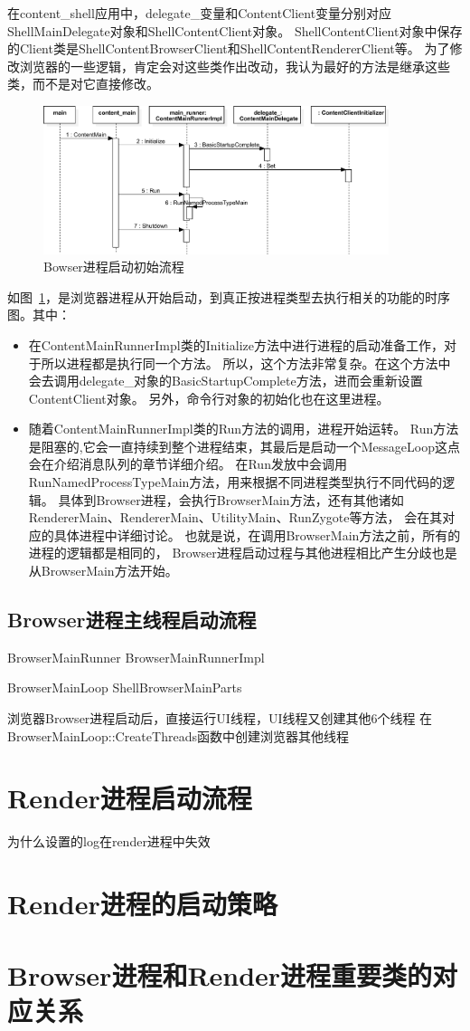 在content\_shell应用中，delegate\_变量和ContentClient变量分别对应ShellMainDelegate对象和ShellContentClient对象。
ShellContentClient对象中保存的Client类是ShellContentBrowserClient和ShellContentRendererClient等。
为了修改浏览器的一些逻辑，肯定会对这些类作出改动，我认为最好的方法是继承这些类，而不是对它直接修改。

\begin{figure}[H] 
  \centering 
  \includegraphics[width=0.90\textwidth]{image/process_study/ContentMainRunnerSequence.pdf} 
  \caption{Bowser进程启动初始流程} \label{fig:ContentMainRunnerSequence} 
\end{figure}

如图~\ref{fig:ContentMainRunnerSequence}，是浏览器进程从开始启动，到真正按进程类型去执行相关的功能的时序图。其中：
\begin{itemize}
  \item 在ContentMainRunnerImpl类的Initialize方法中进行进程的启动准备工作，对于所以进程都是执行同一个方法。
  所以，这个方法非常复杂。在这个方法中会去调用delegate\_对象的BasicStartupComplete方法，进而会重新设置ContentClient对象。
  另外，命令行对象的初始化也在这里进程。
  \item 随着ContentMainRunnerImpl类的Run方法的调用，进程开始运转。
  Run方法是阻塞的,它会一直持续到整个进程结束，其最后是启动一个MessageLoop这点会在介绍消息队列的章节详细介绍。
  在Run发放中会调用RunNamedProcessTypeMain方法，用来根据不同进程类型执行不同代码的逻辑。
  具体到Browser进程，会执行BrowserMain方法，还有其他诸如RendererMain、RendererMain、UtilityMain、RunZygote等方法，
  会在其对应的具体进程中详细讨论。
  也就是说，在调用BrowserMain方法之前，所有的进程的逻辑都是相同的，
  Browser进程启动过程与其他进程相比产生分歧也是从BrowserMain方法开始。
\end{itemize}

\subsection{Browser进程主线程启动流程}


BrowserMainRunner
BrowserMainRunnerImpl

BrowserMainLoop
ShellBrowserMainParts

浏览器Browser进程启动后，直接运行UI线程，UI线程又创建其他6个线程
在BrowserMainLoop::CreateThreads函数中创建浏览器其他线程


\section{Render进程启动流程}

为什么设置的log在render进程中失效

\section{Render进程的启动策略}

\section{Browser进程和Render进程重要类的对应关系}

